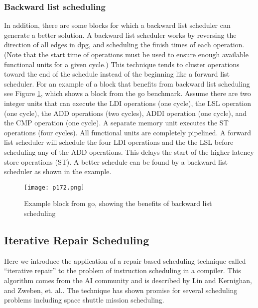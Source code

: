 \subsubsection{Backward list scheduling}
In addition, there are some blocks for which a backward list scheduler can generate a better solution. A
backward list scheduler works by reversing the direction of all edges in dpg, and scheduling the finish times
of each operation. (Note that the start time of operations must be used to ensure enough available functional
units for a given cycle.) This technique tends to cluster operations toward the end of the schedule instead
of the beginning like a forward list scheduler. For an example of a block that benefits from backward list
scheduling see Figure \ref{fig:p172}, which shows a block from the go benchmark. Assume there are two integer units
that can execute the LDI operations (one cycle), the LSL operation (one cycle), the ADD operations (two
cycles), ADDI operation (one cycle), and the CMP operation (one cycle). A separate memory unit executes
the ST operations (four cycles). All functional units are completely pipelined. A forward list scheduler will
schedule the four LDI operations and the the LSL before scheduling any of the ADD operations. This delays
the start of the higher latency store operations (ST). A better schedule can be found by a backward list
scheduler as shown in the example.

\begin{figure}[H]
	\centering
	\texttt{[image: p172.png]}
	\caption{Example block from go, showing the benefits of backward list scheduling}
	\label{fig:p172}
\end{figure}


\subsection{Iterative Repair Scheduling}


Here we introduce the application of a repair based scheduling technique called “iterative repair” to the
problem of instruction scheduling in a compiler. This algorithm comes from the AI community and is described by Lin and 
Kernighan\cite{lin1973effective}, and Zweben, et. al.\cite{zweben1992scheduling,zweben1992learning}. The technique has shown promise for several
scheduling problems including space shuttle mission scheduling.

